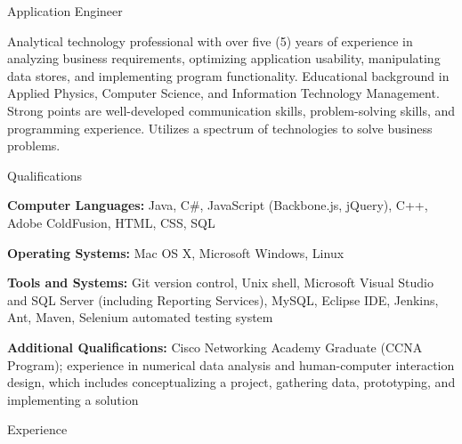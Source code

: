 



\vspace{1mm}

\begin{Large}\textsf{Application Engineer}\end{Large} \vspace{-2mm}

\begin{itemize1}
	\item Analytical technology professional with over five (5) years of experience in analyzing business requirements, optimizing application usability, manipulating data stores, and implementing program functionality.  Educational background in Applied Physics, Computer Science, and Information Technology Management. Strong points are well-developed communication skills, problem-solving skills, and programming experience. Utilizes a spectrum of technologies to solve business problems.
\end{itemize1}

\begin{Large}\textsf{Qualifications}\end{Large} \vspace{-2mm}

\begin{itemize1}
	\item \textbf{Computer Languages:} Java, C\#, JavaScript (Backbone.js, jQuery), C++, Adobe ColdFusion, HTML, CSS, SQL \vspace{2mm}
	\item \textbf{Operating Systems:} Mac OS X, Microsoft Windows, Linux \vspace{2mm}
	\item \textbf{Tools and Systems:} Git version control, Unix shell, Microsoft Visual Studio and SQL Server (including Reporting Services), MySQL, Eclipse IDE, Jenkins, Ant, Maven, Selenium automated testing system \vspace{2mm}
	\item \textbf{Additional Qualifications:} Cisco Networking Academy Graduate (CCNA Program); experience in numerical data analysis and human-computer interaction design, which includes conceptualizing a project, gathering data, prototyping, and implementing a solution
\end{itemize1}

\begin{Large}\textsf{Experience}\end{Large} \vspace{-2mm}

